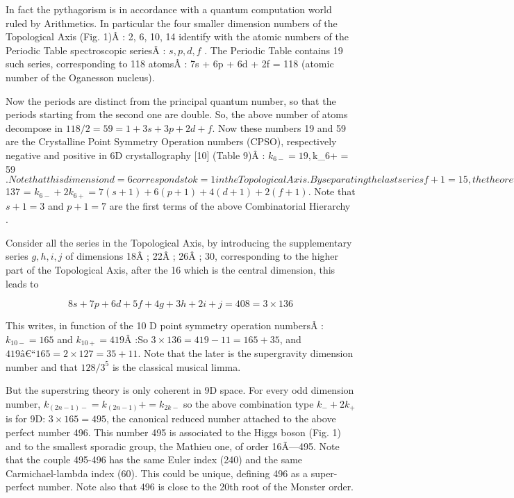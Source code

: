 \documentclass[a4paper,9pt]{article}
\begin{document}
{     In fact the pythagorism is in accordance with a quantum computation world ruled by Arithmetics. In particular the four smaller dimension numbers of the Topological Axis (Fig. 1)Â : 2, 6, 10, 14 identify with the atomic numbers of the Periodic Table spectroscopic seriesÂ : $s, p, d, f$ . The Periodic Table contains 19 such series, corresponding to 118 atomsÂ : 7s + 6p + 6d + 2f = 118 (atomic number of the Oganesson nucleus). 

     Now the periods are distinct from the principal quantum number, so that the periods starting from the second one are double. So, the above number of atoms decompose in $118/2 = 59 = 1 + 3s + 3p + 2d + f$. Now these numbers 19 and 59 are the Crystalline Point Symmetry Operation numbers (CPSO), respectively negative and positive in 6D crystallography [10] (Table 9)Â : $k_{6-} = 19, $k_{6+} = 59$. Note that this dimension d = 6 corresponds to k = 1 in the Topological Axis. By separating the last series f + 1 = 15, the theoretical decomposition 137 = 107 + 30 is justified by the sum $137 =  $k_{6-} + 2k_{6+} = 7(s +1) + 6(p +1) + 4(d +1) + 2(f +1)$. Note that $s + 1 = 3$ and $p + 1 = 7$ are the first terms of the above Combinatorial Hierarchy\cite{Bastin} .

     Consider all the series in the Topological Axis, by introducing the supplementary series $g, h, i, j$ of dimensions 18Â ; 22Â ; 26Â ; 30, corresponding to the higher part of the Topological Axis, after the 16 which is the central dimension, this leads to
     
     \begin{equation}
      8s + 7p + 6 d + 5f + 4g + 3h + 2i + j = 408 = 3 \times 136   
     \end{equation}
      
     
     This writes, in function of the 10 D point symmetry operation numbersÂ :  $k_{10-} = 165$ and $k_{10+} = 419$Â :So  $3 \times 136 = 419 - 11 = 165 + 35$, and $419 â€“ 165 = 2 \times 127 =  35 + 11$. Note that the later is the supergravity dimension number and that $128/3^5$ is the classical musical limma. 
     
     
     But the superstring theory is only coherent in 9D space. For every odd dimension number, $k_{(2n - 1)-} = k_(2n - 1)+ = k_{2k-}$ so the above combination type $k_- + 2k_+$ is for 9D: $3 \times 165 = 495$, the canonical reduced number attached to the above perfect number 496. This number 495 is associated to the Higgs boson (Fig. 1) and to the smallest sporadic group, the Mathieu one, of order 16Ã—495. Note that the couple 495-496 has the same Euler index (240) and the same Carmichael-lambda index (60). This could be unique, defining 496 as a super-perfect number. Note also that 496 is close to the 20th root of the Monster order.
     
}
\end{document}
